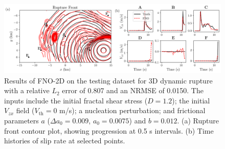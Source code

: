 \documentclass[a4paper,11pt]{article}
\begin{document}
\begin{figure}[H]
    \centering
    \includegraphics[width=1.0\linewidth]{figures/V2/si/3D/7.png}
    \caption{\label{fig:3D_mu_20std}Results of FNO-2D on the testing dataset for 3D dynamic rupture with a relative \(L_2\) error of 0.807 and an NRMSE of 0.0150. The inputs include the initial fractal shear stress (\(D = 1.2\)); the initial \(V_{zx}\) field (\(V_\text{th} = 0\) m/s); a nucleation perturbation; and frictional parameters \(a\) (\(\Delta a_0 = 0.009\), \(a_0 = 0.0075\)) and \(b = 0.012\). (a) Rupture front contour plot, showing progression at 0.5 s intervals. (b) Time histories of slip rate at selected points.
    }
\end{figure}
\end{document}
